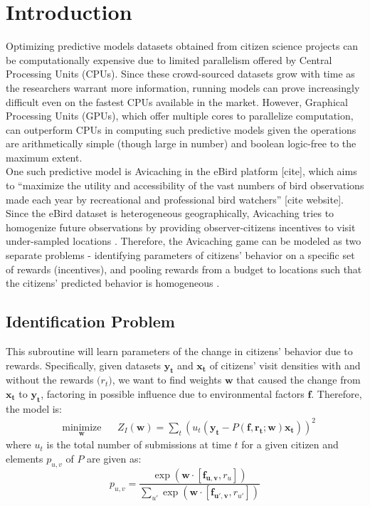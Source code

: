\documentclass[12pt]{article}
\newcommand{\vect}[1]{\mathbf{#1}}
\newcommand{\matr}[1]{\mathbf{#1}}
\begin{document}
    \tableofcontents
    \section{Introduction} \label{introduction}
    Optimizing predictive models datasets obtained from citizen science projects can be computationally expensive due to limited parallelism offered by Central Processing Units (CPUs). Since these crowd-sourced datasets grow with time as the researchers warrant more information, running models can prove increasingly difficult even on the fastest CPUs available in the market. However, Graphical Processing Units (GPUs), which offer multiple cores to parallelize computation, can outperform CPUs in computing such predictive models given the operations are arithmetically simple (though large in number) and boolean logic-free to the maximum extent.\\
    
    One such predictive model is Avicaching \cite{Xue2016Avi1} in the eBird platform [cite], which aims to ``maximize the utility and accessibility of the vast numbers of bird observations made each year by recreational and professional bird watchers'' [cite website]. Since the eBird dataset is heterogeneous geographically, Avicaching tries to homogenize future observations by providing observer-citizens incentives to visit under-sampled locations \cite{Xue2016Avi1}. Therefore, the Avicaching game can be modeled as two separate problems - identifying parameters of citizens' behavior on a specific set of rewards (incentives), and pooling rewards from a budget to locations such that the citizens' predicted behavior is homogeneous \cite{Xue2016Avi2}.
    
    \subsection{Identification Problem} \label{iden_problem}
    This subroutine will learn parameters of the change in citizens' behavior due to rewards. Specifically, given datasets $\vect{y_t}$ and $\vect{x_t}$ of citizens' visit densities with and without the rewards $\vect(r_t)$, we want to find weights $\matr{w}$ that caused the change from $\vect{x_t}$ to $\vect{y_t}$, factoring in possible influence due to environmental factors $\matr{f}$. Therefore, the model is:
    \begin{equation}
    \begin{aligned}
    & \underset{\matr{w}}{\text{minimize}}
    & & Z_I(\matr{w}) = \sum_{t} (u_t(\vect{y_t} - P(\matr{f}, \vect{r_t}; \matr{w})\vect{x_t}))^{2}
    \end{aligned}
    \end{equation}
    where $u_t$ is the total number of submissions at time $t$ for a given citizen and elements $p_{u, v}$ of $P$ are given as:
    \begin{equation} \label{puv_equation}
    p_{u, v} = \frac{\exp{(\matr{w} \cdot [\vect{f_{u, v}}, r_{u}])}}{\sum_{u'} \exp{(\matr{w} \cdot [\vect{f_{u', v}}, r_{u'}])}}
    \end{equation}
    
\end{document}
